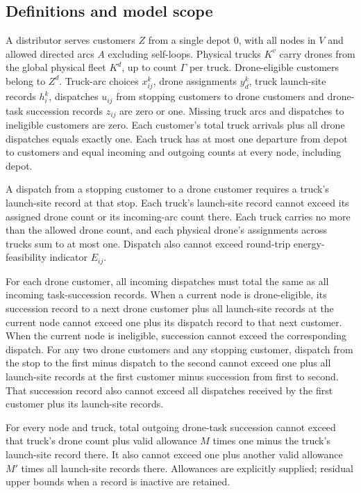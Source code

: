 \documentclass[10pt]{article}
\begin{document}
\subsection*{Definitions and model scope}
A distributor serves customers $Z$ from a single depot $0$, with all nodes in $V$ and allowed directed arcs $A$ excluding self-loops. Physical trucks $K^v$ carry drones from the global physical fleet $K^d$, up to count $\Gamma$ per truck. Drone-eligible customers belong to $Z^d$. Truck-arc choices $x_{ij}^k$, drone assignments $y_d^k$, truck launch-site records $h_i^k$, dispatches $u_{ij}$ from stopping customers to drone customers and drone-task succession records $z_{ij}$ are zero or one. Missing truck arcs and dispatches to ineligible customers are zero. Each customer's total truck arrivals plus all drone dispatches equals exactly one. Each truck has at most one departure from depot to customers and equal incoming and outgoing counts at every node, including depot.

A dispatch from a stopping customer to a drone customer requires a truck's launch-site record at that stop. Each truck's launch-site record cannot exceed its assigned drone count or its incoming-arc count there. Each truck carries no more than the allowed drone count, and each physical drone's assignments across trucks sum to at most one. Dispatch also cannot exceed round-trip energy-feasibility indicator $E_{ij}$.

For each drone customer, all incoming dispatches must total the same as all incoming task-succession records. When a current node is drone-eligible, its succession record to a next drone customer plus all launch-site records at the current node cannot exceed one plus its dispatch record to that next customer. When the current node is ineligible, succession cannot exceed the corresponding dispatch. For any two drone customers and any stopping customer, dispatch from the stop to the first minus dispatch to the second cannot exceed one plus all launch-site records at the first customer minus succession from first to second. That succession record also cannot exceed all dispatches received by the first customer plus its launch-site records.

For every node and truck, total outgoing drone-task succession cannot exceed that truck's drone count plus valid allowance $M$ times one minus the truck's launch-site record there. It also cannot exceed one plus another valid allowance $M'$ times all launch-site records there. Allowances are explicitly supplied; residual upper bounds when a record is inactive are retained.
\end{document}

